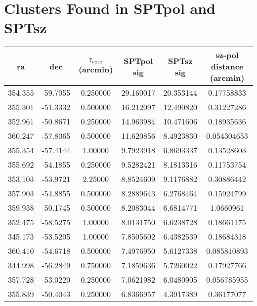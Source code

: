 \documentclass{article}
\begin{document}
\section{Clusters Found in SPTpol and SPTsz}
\begin{tabular}{| c | c | c | c | c | c |}
  \hline
  ra & dec & $\mathrm{r}_\mathrm{core}$ (arcmin) & SPTpol sig & SPTsz sig & sz-pol distance (arcmin) \\
  \hline
      354.355 &      -59.7055 &      0.250000 &        29.160017 & 
       20.353144 &       0.17758833\\
      355.301 &      -51.3332 &      0.500000 &        16.212097 & 
       12.490820 &       0.31227286\\
      352.961 &      -50.8671 &      0.250000 &        14.963984 & 
       10.471606 &       0.18935636\\
      360.247 &      -57.8065 &      0.500000 &        11.620856 & 
       8.4923830 &      0.054304653\\
      355.354 &      -57.4144 &       1.00000 &        9.7923918 & 
       6.8693337 &       0.13528603\\
      355.692 &      -54.1855 &      0.250000 &        9.5282421 & 
       8.1813316 &       0.11753754\\
      353.103 &      -53.9721 &       2.25000 &        8.8524609 & 
       9.1176882 &       0.30886442\\
      357.903 &      -54.8855 &      0.500000 &        8.2889643 & 
       6.2768464 &       0.15924799\\
      359.938 &      -50.1745 &      0.500000 &        8.2083044 & 
       6.6814771 &        1.0660961\\
      352.475 &      -58.5275 &       1.00000 &        8.0131750 & 
       6.6238728 &       0.18661175\\
      345.173 &      -53.5205 &       1.00000 &        7.8505602 & 
       6.4382539 &       0.18684318\\
      360.410 &      -54.6718 &      0.500000 &        7.4976950 & 
       5.6127338 &      0.085810893\\
      344.998 &      -56.2849 &      0.750000 &        7.1859636 & 
       5.7260022 &       0.17927766\\
      357.728 &      -53.0220 &      0.250000 &        7.0621982 & 
       6.0480905 &      0.056785955\\
      355.839 &      -50.4043 &      0.250000 &        6.8366957 & 
       4.3917389 &       0.36177077\\

\end{tabular}
\end{document}
